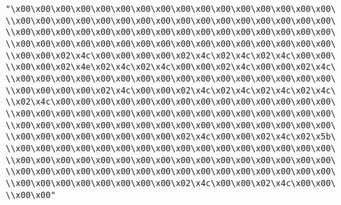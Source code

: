\verb|"\x00\x00\x00\x00\x00\x00\x00\x00\x00\x00\x00\x00\x00\x00\x00\x00\|\newline
\verb|\\x00\x00\x00\x00\x00\x00\x00\x00\x00\x00\x00\x00\x00\x00\x00\x00\|\newline
\verb|\\x00\x00\x00\x00\x00\x00\x00\x00\x00\x00\x00\x00\x00\x00\x00\x00\|\newline
\verb|\\x00\x00\x00\x00\x00\x00\x00\x00\x00\x00\x00\x00\x00\x00\x00\x00\|\newline
\verb|\\x00\x00\x02\x4c\x00\x00\x00\x00\x02\x4c\x02\x4c\x02\x4c\x00\x00\|\newline
\verb|\\x00\x00\x02\x4e\x02\x4c\x02\x4c\x00\x00\x02\x4c\x00\x00\x02\x4c\|\newline
\verb|\\x00\x00\x00\x00\x00\x00\x00\x00\x00\x00\x00\x00\x00\x00\x00\x00\|\newline
\verb|\\x00\x00\x00\x00\x02\x4c\x00\x00\x02\x4c\x02\x4c\x02\x4c\x02\x4c\|\newline
\verb|\\x02\x4c\x00\x00\x00\x00\x00\x00\x00\x00\x00\x00\x00\x00\x00\x00\|\newline
\verb|\\x00\x00\x00\x00\x00\x00\x00\x00\x00\x00\x00\x00\x00\x00\x00\x00\|\newline
\verb|\\x00\x00\x00\x00\x00\x00\x00\x00\x00\x00\x00\x00\x00\x00\x00\x00\|\newline
\verb|\\x00\x00\x00\x00\x00\x00\x00\x00\x02\x4c\x00\x00\x02\x4c\x02\x5b\|\newline
\verb|\\x00\x00\x00\x00\x00\x00\x00\x00\x00\x00\x00\x00\x00\x00\x00\x00\|\newline
\verb|\\x00\x00\x00\x00\x00\x00\x00\x00\x00\x00\x00\x00\x00\x00\x00\x00\|\newline
\verb|\\x00\x00\x00\x00\x00\x00\x00\x00\x00\x00\x00\x00\x00\x00\x00\x00\|\newline
\verb|\\x00\x00\x00\x00\x00\x00\x00\x00\x02\x4c\x00\x00\x02\x4c\x00\x00\|\newline
\verb|\\x00\x00"|\newline
